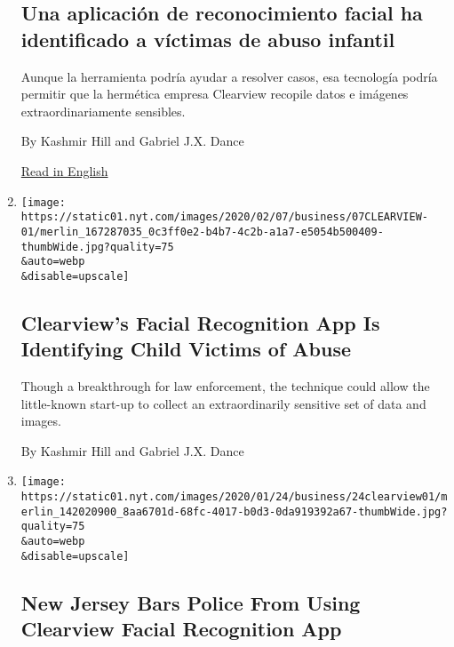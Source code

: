 \begin{enumerate}
  \hypertarget{una-aplicaciuxf3n-de-reconocimiento-facial-ha-identificado-a-vuxedctimas-de-abuso-infantil}{%
  \subsection{Una aplicación de reconocimiento facial ha identificado a
  víctimas de abuso
  infantil}\label{una-aplicaciuxf3n-de-reconocimiento-facial-ha-identificado-a-vuxedctimas-de-abuso-infantil}}

  Aunque la herramienta podría ayudar a resolver casos, esa tecnología
  podría permitir que la hermética empresa Clearview recopile datos e
  imágenes extraordinariamente sensibles.

  By Kashmir Hill and Gabriel J.X. Dance

  \href{https://www.nytimes.com/2020/02/07/business/clearview-facial-recognition-child-sexual-abuse.html}{Read
  in English}
\item
  \href{/2020/02/07/business/clearview-facial-recognition-child-sexual-abuse.html}{}

  \texttt{[image: https://static01.nyt.com/images/2020/02/07/business/07CLEARVIEW-01/merlin\_167287035\_0c3ff0e2-b4b7-4c2b-a1a7-e5054b500409-thumbWide.jpg?quality=75\\\&auto=webp\\\&disable=upscale]}

  \hypertarget{clearviews-facial-recognition-app-is-identifying-child-victims-of-abuse}{%
  \subsection{Clearview's Facial Recognition App Is Identifying Child
  Victims of
  Abuse}\label{clearviews-facial-recognition-app-is-identifying-child-victims-of-abuse}}

  Though a breakthrough for law enforcement, the technique could allow
  the little-known start-up to collect an extraordinarily sensitive set
  of data and images.

  By Kashmir Hill and Gabriel J.X. Dance
\item
  \href{/2020/01/24/technology/clearview-ai-new-jersey.html}{}

  \texttt{[image: https://static01.nyt.com/images/2020/01/24/business/24clearview01/merlin\_142020900\_8aa6701d-68fc-4017-b0d3-0da919392a67-thumbWide.jpg?quality=75\\\&auto=webp\\\&disable=upscale]}

  \hypertarget{new-jersey-bars-police-from-using-clearview-facial-recognition-app}{%
  \subsection{New Jersey Bars Police From Using Clearview Facial
  Recognition
  App}\label{new-jersey-bars-police-from-using-clearview-facial-recognition-app}}


\end{enumerate}
